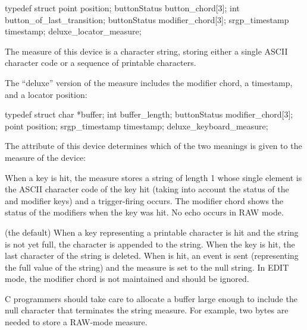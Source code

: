               typedef struct \lb
                 point position;
                 buttonStatus button_chord[3];
                 int button_of_last_transition;
                 buttonStatus modifier_chord[3]; 
                 srgp_timestamp timestamp;
              \rb deluxe_locator_measure;
\endcode


\bigskip




The measure of this device is a character string, storing either
a single ASCII character code or a sequence of printable characters.

\itemmm{} 
The ``deluxe'' version of the measure includes the modifier chord, a
timestamp, and a locator position:

\begincode
               typedef struct \lb
                  char *buffer;   
                  int buffer_length;   
                  buttonStatus modifier_chord[3];
                  point position;
                  srgp_timestamp timestamp;
               \rb deluxe_keyboard_measure;
\endcode

\itemmm{}
The  attribute of this device determines which of the two
meanings is given to the measure of the device:


When a key is hit, the measure stores a string of length 1 whose single element
is the ASCII character code of the key hit (taking into account the status of
the  and  modifier keys) and a trigger-firing
occurs.  The modifier chord shows the status of the modifiers when the key was
hit.  No echo occurs in RAW mode.

(the default)
When a key representing a printable character is hit and the string is
not yet full, the character is appended to the string.  When the
 key is hit, the last character of the string is
deleted.  When  is hit, an event is sent (representing the full
value of the string) and the measure is set to the null string.  In EDIT mode,
the modifier chord is not maintained and should be ignored.

\newpar
C programmers should take care to allocate a buffer large enough to include the 
null character that terminates the string measure.  For example, two bytes
are needed to store a RAW-mode measure.




